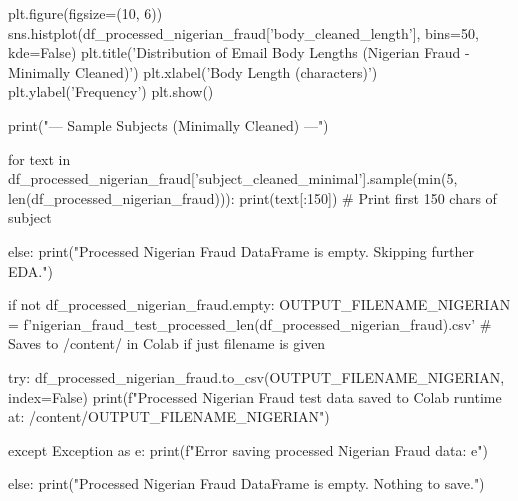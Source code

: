 \begin{ffcode}
    plt.figure(figsize=(10, 6))
    sns.histplot(df_processed_nigerian_fraud['body_cleaned_length'], bins=50, kde=False)
    plt.title('Distribution of Email Body Lengths (Nigerian Fraud - Minimally Cleaned)')
    plt.xlabel('Body Length (characters)')
    plt.ylabel('Frequency')
    plt.show()

    print("\n--- Sample Subjects (Minimally Cleaned) ---")

    for text in df_processed_nigerian_fraud['subject_cleaned_minimal'].sample(min(5, len(df_processed_nigerian_fraud))):
        print(text[:150]) # Print first 150 chars of subject

else:
    print("Processed Nigerian Fraud DataFrame is empty. Skipping further EDA.")

if not df_processed_nigerian_fraud.empty:
    OUTPUT_FILENAME_NIGERIAN = f'nigerian_fraud_test_processed_{len(df_processed_nigerian_fraud)}.csv'
    # Saves to /content/ in Colab if just filename is given

    try:
        df_processed_nigerian_fraud.to_csv(OUTPUT_FILENAME_NIGERIAN, index=False)
        print(f"Processed Nigerian Fraud test data saved to Colab runtime at: /content/{OUTPUT_FILENAME_NIGERIAN}")

    except Exception as e:
        print(f"Error saving processed Nigerian Fraud data: {e}")

else:
    print("Processed Nigerian Fraud DataFrame is empty. Nothing to save.")
\end{ffcode}